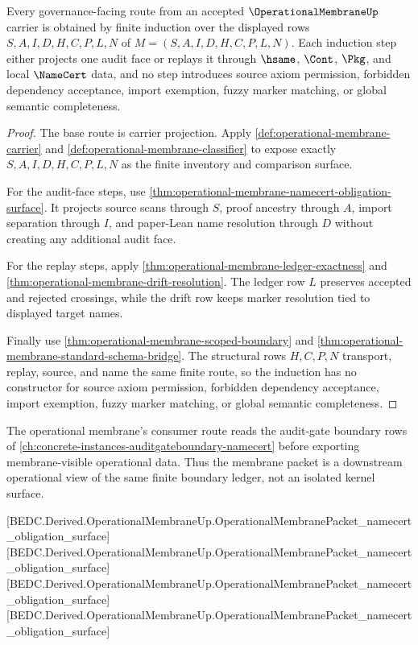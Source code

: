 \begin{theorem}
\label{thm:operational-membrane-finite-route-induction}
Every governance-facing route from an accepted $\OperationalMembraneUp$ carrier is obtained by finite induction over the displayed rows $S,A,I,D,H,C,P,L,N$ of $M=(S,A,I,D,H,C,P,L,N)$. Each induction step either projects one audit face or replays it through $\hsame$, $\Cont$, $\Pkg$, and local $\NameCert$ data, and no step introduces source axiom permission, forbidden dependency acceptance, import exemption, fuzzy marker matching, or global semantic completeness.
\end{theorem}
\begin{proof}
The base route is carrier projection. Apply \autoref{def:operational-membrane-carrier} and \autoref{def:operational-membrane-classifier} to expose exactly $S,A,I,D,H,C,P,L,N$ as the finite inventory and comparison surface.

For the audit-face steps, use \autoref{thm:operational-membrane-namecert-obligation-surface}. It projects source scans through $S$, proof ancestry through $A$, import separation through $I$, and paper-Lean name resolution through $D$ without creating any additional audit face.

For the replay steps, apply \autoref{thm:operational-membrane-ledger-exactness} and \autoref{thm:operational-membrane-drift-resolution}. The ledger row $L$ preserves accepted and rejected crossings, while the drift row keeps marker resolution tied to displayed target names.

Finally use \autoref{thm:operational-membrane-scoped-boundary} and \autoref{thm:operational-membrane-standard-schema-bridge}. The structural rows $H,C,P,N$ transport, replay, source, and name the same finite route, so the induction has no constructor for source axiom permission, forbidden dependency acceptance, import exemption, fuzzy marker matching, or global semantic completeness.
\end{proof}

The operational membrane's consumer route reads the audit-gate boundary rows of \autoref{ch:concrete-instances-auditgateboundary-namecert} before exporting membrane-visible operational data. Thus the membrane packet is a downstream operational view of the same finite boundary ledger, not an isolated kernel surface.

[BEDC.Derived.OperationalMembraneUp.OperationalMembranePacket\_namecert\_obligation\_surface]
[BEDC.Derived.OperationalMembraneUp.OperationalMembranePacket\_namecert\_obligation\_surface]
[BEDC.Derived.OperationalMembraneUp.OperationalMembranePacket\_namecert\_obligation\_surface]
[BEDC.Derived.OperationalMembraneUp.OperationalMembranePacket\_namecert\_obligation\_surface]


